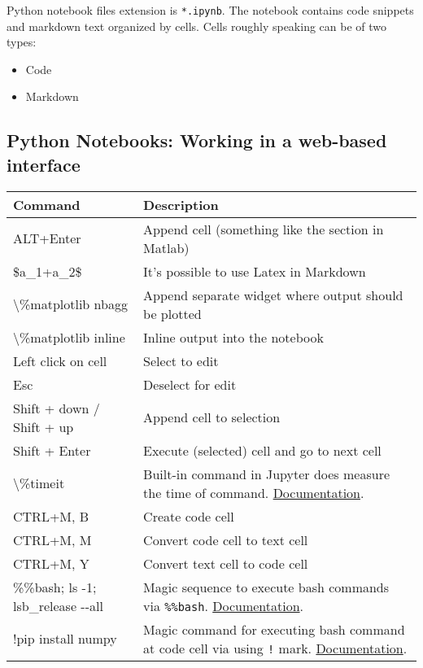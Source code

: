 \documentclass[
]{article}
\begin{document}
Python notebook files extension is \texttt{*.ipynb}. The notebook
contains code snippets and markdown text organized by cells. Cells
roughly speaking can be of two types:

\begin{itemize}
\item
  Code
\item
  Markdown
\end{itemize}

\hypertarget{python-notebooks-working-in-a-web-based-interface}{%
\subsection{Python Notebooks: Working in a web-based
interface}\label{python-notebooks-working-in-a-web-based-interface}}

\begin{longtable}[]{@{}ll@{}}
\toprule
\textbf{Command} & \textbf{Description} \\
\midrule
\endhead
ALT+Enter & Append cell (something like the section in Matlab) \\
\$a\_1+a\_2\$ & It's possible to use Latex in Markdown \\
\textbackslash\%matplotlib nbagg & Append separate widget where output
should be plotted \\
\textbackslash\%matplotlib inline & Inline output into the notebook \\
Left click on cell & Select to edit \\
Esc & Deselect for edit \\
Shift + down / Shift + up & Append cell to selection \\
Shift + Enter & Execute (selected) cell and go to next cell \\
\textbackslash\%timeit & Built-in command in Jupyter does measure the
time of command.
\href{https://ipython.org/ipython-doc/dev/interactive/magics.html\#magic-timeit}{Documentation}. \\
CTRL+M, B & Create code cell \\
CTRL+M, M & Convert code cell to text cell \\
CTRL+M, Y & Convert text cell to code cell \\
\%\%bash; ls -1; lsb\_release -\/-all & Magic sequence to execute bash
commands via \texttt{\%\%bash}.
\href{https://ipython.org/ipython-doc/dev/interactive/magics.html\#cellmagic-bash}{Documentation}. \\
!pip install numpy & Magic command for executing bash command at code
cell via using \texttt{!} mark.
\href{https://ipython.org/ipython-doc/dev/interactive/magics.html\#magic-sx}{Documentation}. \\
\bottomrule
\end{longtable}
\end{document}
